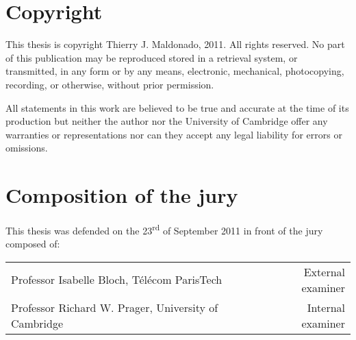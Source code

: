 \section*{Copyright}
This thesis is copyright Thierry J. Maldonado, 2011.
All rights reserved. No part of this publication may be reproduced stored in a retrieval system, or transmitted, in any form or by any means, electronic, mechanical, photocopying, recording, or otherwise, without prior permission.

All statements in this work are believed to be true and accurate at the time of its production but neither the author nor the University of Cambridge offer any warranties or representations nor can they accept any legal liability for errors or omissions.

\section*{Composition of the jury}
This thesis was defended on the 23\textsuperscript{rd} of September 2011 in front of the jury composed of:
{
\renewcommand{\arraystretch}{8}
\begin{center}
\begin{tabularx}{1\textwidth}{X r}
Professor Isabelle Bloch, T\'{e}l\'{e}com ParisTech & External examiner\\
Professor Richard W. Prager, University of Cambridge & Internal examiner\\
\end{tabularx}
\end{center}
}